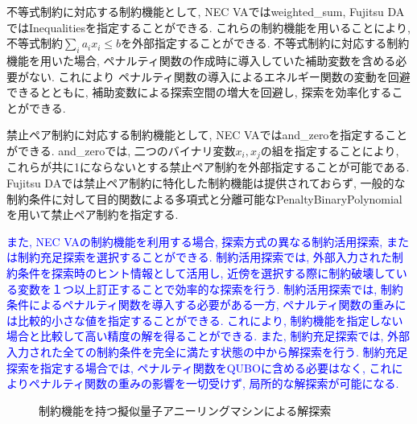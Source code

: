 \documentclass[submit,techrep,noauthor]{ipsj}
\begin{document}
不等式制約に対応する制約機能として, NEC VAではweighted\_sum, Fujitsu DAではInequalitiesを指定することができる. これらの制約機能を用いることにより, 不等式制約$\sum_{i}a_{i}x_{i}\le b$を外部指定することができる. 不等式制約に対応する制約機能を用いた場合, ペナルティ関数の作成時に導入していた補助変数を含める必要がない. これにより ペナルティ関数の導入によるエネルギー関数の変動を回避できるとともに, 補助変数による探索空間の増大を回避し, 探索を効率化することができる.

禁止ペア制約に対応する制約機能として, NEC VAではand\_zeroを指定することができる. and\_zeroでは, 二つのバイナリ変数$x_{i}, x_{j}$の組を指定することにより, これらが共に1にならないとする禁止ペア制約を外部指定することが可能である. Fujitsu DAでは禁止ペア制約に特化した制約機能は提供されておらず, 一般的な制約条件に対して目的関数による多項式と分離可能なPenaltyBinaryPolynomialを用いて禁止ペア制約を指定する.

\textcolor{blue}{また, NEC VAの制約機能を利用する場合, 探索方式の異なる制約活用探索, または制約充足探索を選択することができる. 制約活用探索では, 外部入力された制約条件を探索時のヒント情報として活用し, 近傍を選択する際に制約破壊している変数を１つ以上訂正することで効率的な探索を行う. 制約活用探索では, 制約条件によるペナルティ関数を導入する必要がある一方, ペナルティ関数の重みには比較的小さな値を指定することができる. これにより, 制約機能を指定しない場合と比較して高い精度の解を得ることができる. また, 制約充足探索では, 外部入力された全ての制約条件を完全に満たす状態の中から解探索を行う. 制約充足探索を指定する場合では, ペナルティ関数をQUBOに含める必要はなく, これによりペナルティ関数の重みの影響を一切受けず, 局所的な解探索が可能になる.}

\begin{figure}[tb]
\centering
{}
\hspace{5mm}
\caption{制約機能を持つ擬似量子アニーリングマシンによる解探索}
\label{va_search}
\end{figure}
\end{document}
